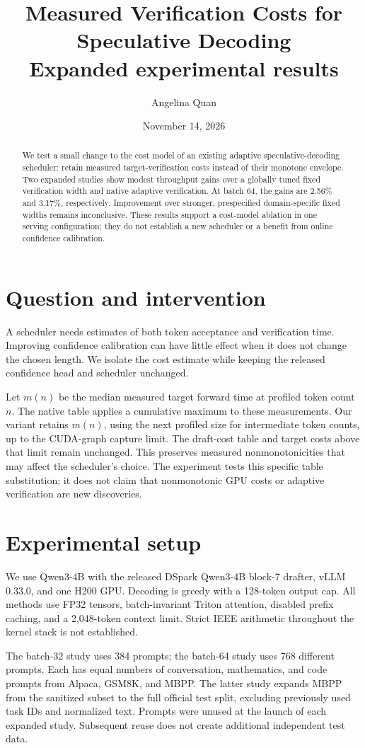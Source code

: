 \documentclass[10pt]{article}
\title{Measured Verification Costs for Speculative Decoding\\\large Expanded experimental results}
\author{Angelina Quan}
\date{November 14, 2026}
\begin{document}
\maketitle
\begin{abstract}
We test a small change to the cost model of an existing adaptive speculative-decoding scheduler: retain measured target-verification costs instead of their monotone envelope. Two expanded studies show modest throughput gains over a globally tuned fixed verification width and native adaptive verification. At batch 64, the gains are 2.56\% and 3.17\%, respectively. Improvement over stronger, prespecified domain-specific fixed widths remains inconclusive. These results support a cost-model ablation in one serving configuration; they do not establish a new scheduler or a benefit from online confidence calibration.
\end{abstract}
\section{Question and intervention}
A scheduler needs estimates of both token acceptance and verification time. Improving confidence calibration can have little effect when it does not change the chosen length. We isolate the cost estimate while keeping the released confidence head and scheduler unchanged.

Let $m(n)$ be the median measured target forward time at profiled token count $n$. The native table applies a cumulative maximum to these measurements. Our variant retains $m(n)$, using the next profiled size for intermediate token counts, up to the CUDA-graph capture limit. The draft-cost table and target costs above that limit remain unchanged. This preserves measured nonmonotonicities that may affect the scheduler's choice. The experiment tests this specific table substitution; it does not claim that nonmonotonic GPU costs or adaptive verification are new discoveries.
\section{Experimental setup}
We use Qwen3-4B with the released DSpark Qwen3-4B block-7 drafter, vLLM 0.33.0, and one H200 GPU. Decoding is greedy with a 128-token output cap. All methods use FP32 tensors, batch-invariant Triton attention, disabled prefix caching, and a 2,048-token context limit. Strict IEEE arithmetic throughout the kernel stack is not established.

The batch-32 study uses 384 prompts; the batch-64 study uses 768 different prompts. Each has equal numbers of conversation, mathematics, and code prompts from Alpaca, GSM8K, and MBPP. The latter study expands MBPP from the sanitized subset to the full official test split, excluding previously used task IDs and normalized text. Prompts were unused at the launch of each expanded study. Subsequent reuse does not create additional independent test data.
\end{document}
